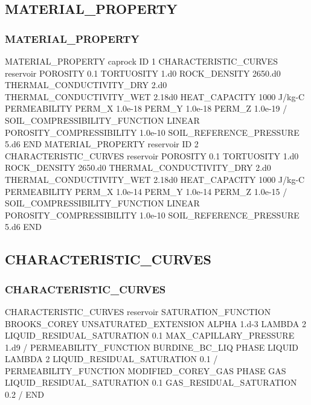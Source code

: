 \documentclass{beamer}
\begin{document}
\subsection{MATERIAL\_PROPERTY}

\begin{frame}\frametitle{MATERIAL\_PROPERTY}

\begin{semiverbatim}
MATERIAL_PROPERTY caprock
  ID 1
  CHARACTERISTIC_CURVES reservoir
  POROSITY 0.1
  TORTUOSITY 1.d0
  ROCK_DENSITY 2650.d0
  THERMAL_CONDUCTIVITY_DRY 2.d0
  THERMAL_CONDUCTIVITY_WET 2.18d0
  HEAT_CAPACITY 1000 J/kg-C
\newpage
  PERMEABILITY
    PERM_X 1.0e-18
    PERM_Y 1.0e-18
    PERM_Z 1.0e-19
  /
  SOIL_COMPRESSIBILITY_FUNCTION LINEAR
  POROSITY_COMPRESSIBILITY 1.0e-10
  SOIL_REFERENCE_PRESSURE 5.d6
END 
\newpage
MATERIAL_PROPERTY reservoir
  ID 2
  CHARACTERISTIC_CURVES reservoir
  POROSITY 0.1
  TORTUOSITY 1.d0
  ROCK_DENSITY 2650.d0
  THERMAL_CONDUCTIVITY_DRY 2.d0
  THERMAL_CONDUCTIVITY_WET 2.18d0
  HEAT_CAPACITY 1000 J/kg-C
\newpage
  PERMEABILITY
    PERM_X 1.0e-14
    PERM_Y 1.0e-14
    PERM_Z 1.0e-15
  /
  SOIL_COMPRESSIBILITY_FUNCTION LINEAR
  POROSITY_COMPRESSIBILITY 1.0e-10
  SOIL_REFERENCE_PRESSURE 5.d6
END
\end{semiverbatim}

\end{frame}

\subsection{CHARACTERISTIC\_CURVES}

\begin{frame}\frametitle{CHARACTERISTIC\_CURVES}
\begin{semiverbatim}
CHARACTERISTIC_CURVES reservoir
  SATURATION_FUNCTION BROOKS_COREY
    UNSATURATED_EXTENSION
    ALPHA 1.d-3
    LAMBDA 2
    LIQUID_RESIDUAL_SATURATION 0.1
    MAX_CAPILLARY_PRESSURE 1.d9
  /
\newpage
  PERMEABILITY_FUNCTION BURDINE_BC_LIQ
    PHASE LIQUID
    LAMBDA 2
    LIQUID_RESIDUAL_SATURATION 0.1
  /
  PERMEABILITY_FUNCTION MODIFIED_COREY_GAS
    PHASE GAS
    LIQUID_RESIDUAL_SATURATION 0.1
    GAS_RESIDUAL_SATURATION 0.2
  /
END
\end{semiverbatim}

\end{frame}
\end{document}
